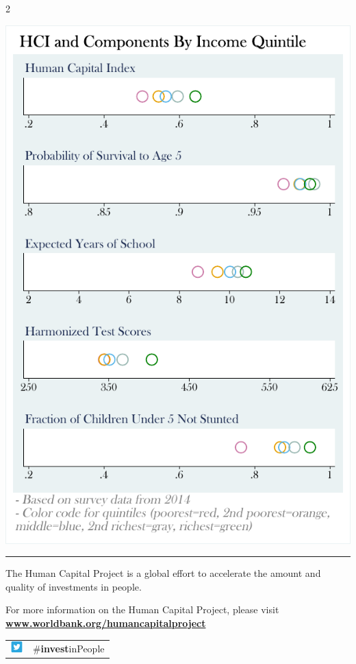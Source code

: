 \documentclass[8pt,]{article}
\begin{document}
\begin {multicols}{2}
\begin{flushright}\includegraphics[width=1\linewidth]{charts/ses_SLV} \end{flushright}

\noindent

\rule{9cm}{0.4pt}

The Human Capital Project is a global effort to accelerate the amount
and quality of investments in people. ~

For more information on the Human Capital Project, please visit
\textbf{\href{https://www.worldbank.org/humancapitalproject}{www.worldbank.org/humancapitalproject}}

\begin{table}[H]
\begin{tabular}{ll}
\includegraphics[width=0.5cm]{static/twitter.png} & \#\textbf{invest}inPeople   \\
\end{tabular}
\end{table}

\end {multicols}
\end{document}

